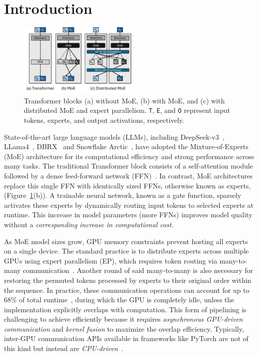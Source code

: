 \section{Introduction}\label{sec:introduction}

\begin{figure}
    \centering
    \includegraphics[width=0.51\textwidth, keepaspectratio]{figures/fig-bg-moe}
    \caption{Transformer blocks (a) without MoE, (b) with MoE, and (c) with distributed MoE and expert parallelism.
    \texttt{T}, \texttt{E}, and \texttt{O} represent input tokens, experts, and output activations, respectively.}
    \label{fig:bg:moe}
    \vspace{-10pt}
\end{figure}
State-of-the-art large language models (LLMs), including DeepSeek-v3~\cite{deepep}, LLama4~\cite{llama4},
DBRX~\cite{dbrx} and Snowflake Arctic~\cite{arctic},
have adopted the Mixture-of-Experts (MoE) architecture for its
computational efficiency and strong performance across many tasks.
The traditional Transformer block consists of a self-attention module followed by a
dense feed-forward network (FFN)~\cite{NIPS2017_3f5ee243}.
In contrast, MoE architectures replace this single FFN with identically sized FFNs,
otherwise known as experts, (Figure~\ref{fig:bg:moe}(b)).
A trainable neural network, known as a gate function, sparsely activates these experts by
dynamically routing input tokens to selected experts at runtime.
This increase in model parameters (more FFNs) improves model quality without a
\textit{corresponding increase in computational cost}.

As MoE model sizes grow, GPU memory constraints prevent hosting all experts on a single device.
The standard practice is to distribute experts across multiple GPUs using expert parallelism (EP),
which requires token routing via many-to-many communication~\cite{deepep, arctic, dbrx, 10.1145/3577193.3593704}.
Another round of said many-to-many is also necessary for restoring the permuted tokens processed by experts
to their original order within the sequence.
In practice, these communication operations
can account for up to 68\% of total runtime~\cite{10.1145/3603269.3604869, MLSYS2024_339caf45},
during which the GPU is completely idle, unless the implementation explicitly overlaps with computation.
This form of pipelining is challenging to achieve efficiently because it requires
\emph{asynchronous GPU-driven communication} and \emph{kernel fusion} to maximize the overlap efficiency.
Typically, inter-GPU communication APIs available in frameworks like PyTorch are not of this kind but instead are
\emph{CPU-driven}~\cite{nccl}.


